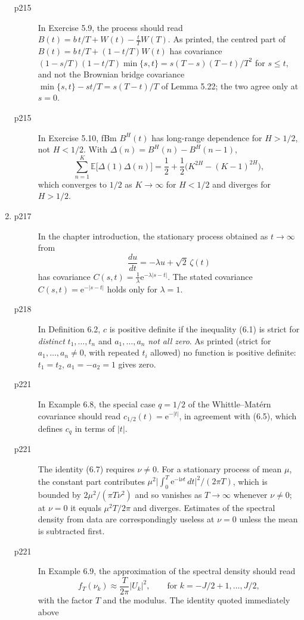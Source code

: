 \documentclass[final]{article}
\theoremstyle{definition}
\begin{document}
\begin{enumerate}
\begin{description}
   \item[p215] In Exercise 5.9, the process should read
$B(t)=b\,t/T+W(t)-\frac{t}{T}W(T)$. As printed, the centred part of
$B(t)=b\,t/T+(1-t/T)W(t)$ has covariance
$(1-s/T)(1-t/T)\min\{s,t\}=s(T-s)(T-t)/T^{2}$ for $s\le t$, and not the
Brownian bridge covariance $\min\{s,t\}-st/T=s(T-t)/T$ of Lemma 5.22; the two
agree only at $s=0$.
   \item[p215] In Exercise 5.10, fBm $B^{H}(t)$ has long-range dependence for
$H>1/2$, not $H<1/2$. With $\Delta(n)=B^{H}(n)-B^{H}(n-1)$,
\[
\sum_{n=1}^{K}\mathbb{E}\bigl[\Delta(1)\Delta(n)\bigr]
=\frac12+\frac12\bigl(K^{2H}-(K-1)^{2H}\bigr),
\]
which converges to $1/2$ as $K\to\infty$ for $H<1/2$ and diverges for $H>1/2$.
   \end{description}
 \item%
   \begin{description}
   \item[p217] In the chapter introduction, the stationary process obtained as
$t\to\infty$ from
\[
\frac{du}{dt}=-\lambda u+\sqrt{2}\,\zeta(t)
\]
has covariance $C(s,t)=\frac{1}{\lambda}\mathrm{e}^{-\lambda|s-t|}$. The stated
covariance $C(s,t)=\mathrm{e}^{-|s-t|}$ holds only for $\lambda=1$.
   \item[p218] In Definition 6.2, $c$ is positive definite if the inequality
(6.1) is strict for \emph{distinct} $t_1,\dots,t_n$ and $a_1,\dots,a_n$
\emph{not all zero}. As printed (strict for $a_1,\dots,a_n\ne0$, with
repeated $t_i$ allowed) no function is positive definite: $t_1=t_2$,
$a_1=-a_2=1$ gives zero.
   \item[p221] In Example 6.8, the special case $q=1/2$ of the
Whittle--Mat\'ern covariance should read $c_{1/2}(t)=\mathrm{e}^{-|t|}$, in
agreement with (6.5), which defines $c_q$ in terms of $|t|$.
   \item[p221] The identity (6.7) requires $\nu\ne0$. For a stationary process
of mean $\mu$, the constant part contributes
$\mu^{2}\bigl|\int_0^T\mathrm{e}^{-\mathrm{i}\nu t}\,dt\bigr|^{2}/(2\pi T)$,
which is bounded by $2\mu^{2}/(\pi T\nu^{2})$ and so vanishes as $T\to\infty$
whenever $\nu\ne0$; at $\nu=0$ it equals $\mu^{2}T/2\pi$ and diverges.
Estimates of the spectral density from data are correspondingly useless at
$\nu=0$ unless the mean is subtracted first.
   \item[p221] In Example 6.9, the approximation of the spectral density should
read
\[
f_T(\nu_k)\approx\frac{T}{2\pi}|U_k|^2,
\qquad\text{for }k=-J/2+1,\dots,J/2,
\]
with the factor $T$ and the modulus. The identity quoted immediately above

\end{description}
\end{enumerate}
\end{document}
